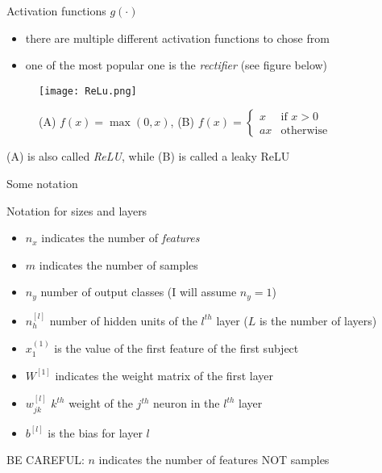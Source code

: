 \documentclass{beamer}
\begin{document}
\begin{frame}[t]{Activation functions $g(\cdot)$}
  \begin{itemize}
    \item there are multiple different activation functions to chose from
    \item one of the most popular one is the \emph{rectifier} (see figure below)
  \end{itemize}
  \begin{figure}[htpb]
    \centering
    \texttt{[image: ReLu.png]}
    \caption{(A) $f(x) = \max(0, x)$, (B) $f(x) = \begin{cases} x & \mbox{if } x > 0 \\ ax & \mbox{otherwise} \end{cases}$}
  \end{figure}
  (A) is also called \emph{ReLU}, while (B) is called a leaky ReLU
\end{frame}

\begin{frame}[t]{Some notation}
  \begin{alertblock}{Notation for sizes and layers}
    \begin{itemize}
      \small
      \item $n_x$ indicates the number of \emph{features}
      \item $m$ indicates the number of samples
      \item $n_y$ number of output classes (I will assume $n_y =1 $)
      \item $n_h^{[l]}$ number of hidden units of the $l^{th}$ layer ($L$ is the number of layers)
      \item $x^{(1)}_1$ is the value of the first feature of the first subject
      \item $W^{[1]}$ indicates the weight matrix of the first layer
      \item $w^{[l]}_{jk}$ $k^{th}$ weight of the $j^{th}$ neuron in the $l^{th}$ layer
      \item $b^{[l]}$ is the bias for layer $l$
    \end{itemize}
  \end{alertblock}
  BE CAREFUL: $n$ indicates the number of features NOT samples
\end{frame}
\end{document}
